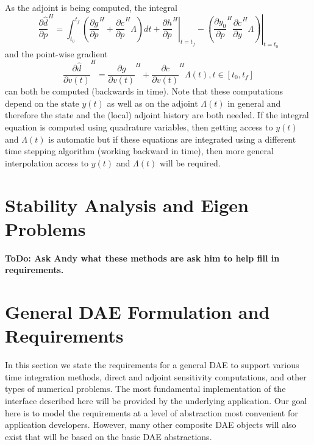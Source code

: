 \documentclass[pdf,ps2pdf,11pt]{SANDreport}
\begin{document}
As the adjoint is being computed, the integral
%
\begin{equation}
\frac{\partial \hat{d}}{\partial p}^H =
\int_{t_0}^{t_f} \left(
    \frac{\partial g}{\partial p}^H
    + \frac{\partial c}{\partial p}^H \Lambda
  \right) dt
  + \left. \frac{\partial h}{\partial p}^H \right|_{t=t_f}
  - \left. \left( \frac{\partial y_0}{\partial p}^H \frac{\partial c}{\partial \dot{y}}^H \Lambda \right) \right|_{t=t_0}
\label{rythmos:eqn:sens:d_d_hat_d_p}
\end{equation}
%
and the point-wise gradient
%
%
\begin{equation}
\frac{\partial \hat{d}}{\partial v(t)}^H
= \frac{\partial g}{\partial v(t)}^H + \frac{\partial c}{\partial v(t)}^H \Lambda(t),
t\in[t_0,t_f]
\label{rythmos:eqn:sens:d_d_hat_d_v_t}
\end{equation}
%
can both be computed (backwards in time).  Note that these computations depend
on the state $y(t)$ as well as on the adjoint $\Lambda(t)$ in general and
therefore the state and the (local) adjoint history are both needed.  If the
integral equation is computed using quadrature variables, then getting access
to $y(t)$ and $\Lambda(t)$ is automatic but if these equations are integrated
using a different time stepping algorithm (working backward in time), then
more general interpolation access to $y(t)$ and $\Lambda(t)$ will be required.

\section{Stability Analysis and Eigen Problems}

{}\textbf{ToDo: Ask Andy what these methods are ask him to help fill in
requirements.}

\section{General DAE Formulation and Requirements}
\label{rythmos:sec:general-dae-requirements}

In this section we state the requirements for a general DAE to support various
time integration methods, direct and adjoint sensitivity computations, and
other types of numerical problems.  The most fundamental implementation of the
interface described here will be provided by the underlying application.  Our
goal here is to model the requirements at a level of abstraction most
convenient for application developers.  However, many other composite DAE
objects will also exist that will be based on the basic DAE abstractions.
\end{document}
